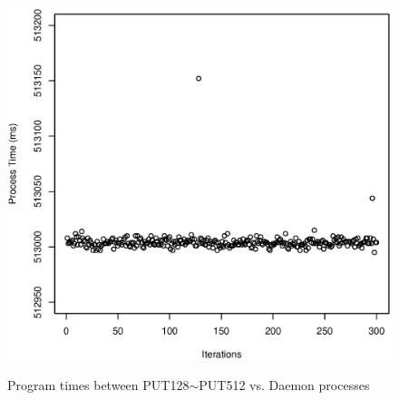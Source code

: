 \documentclass[10pt]{article}
\begin{document}
\begin{figure}[htp!]
{		\includegraphics[scale=0.35]{put512_pt.eps}
		\label{fig:put512_pt}
	}
	\caption{Program times between PUT128$\sim$PUT512 vs. Daemon processes~\label{fig:put_daemon_pt3}}
\end{figure}
\end{document}
